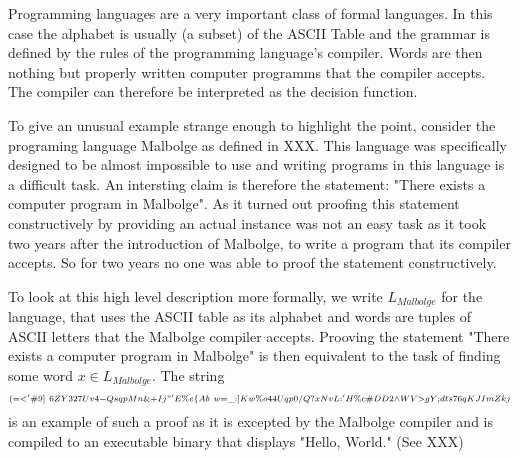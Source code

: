 \begin{example}Programming languages are a very important class of formal languages. In this case the alphabet is usually (a subset) of the ASCII Table and the grammar is defined by the rules of the programming language's compiler. Words are then nothing but properly written computer programms that the compiler accepts. The compiler can therefore be interpreted as the decision function.

To give an unusual example strange enough to highlight the point, consider the programing language Malbolge as defined in XXX. This language was specifically designed to be almost impossible to use and writing programs in this language is a difficult task. An intersting claim is therefore the statement: "There exists a computer program in Malbolge". As it turned out proofing this statement constructively by providing an actual instance was not an easy task as it took two years after the introduction of Malbolge, to write a program that its compiler accepts. So for two years no one was able to proof the statement constructively.

To look at this high level description more formally, we write $L_{Malbolge}$ for the language, that uses the ASCII table as its alphabet and words are tuples of ASCII letters that the Malbolge compiler accepts. Prooving the statement "There exists a computer program in Malbolge" is then equivalent to the task of finding some word $x\in L_{Malbolge}$. The string
$$
\scriptstyle (=<'\#9]~6ZY327Uv4-QsqpMn\&+Ij"'E\%e\{Ab~w=\_:]Kw\%o44Uqp0/Q?xNvL:'H\%c\#DD2\wedge WV>gY;dts76qKJImZkj
$$
is an example of such a proof as it is excepted by the Malbolge compiler and is compiled to an executable binary that displays "Hello, World." (See XXX)
\end{example}

